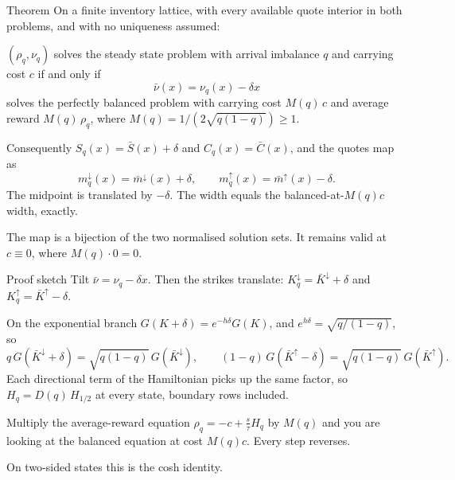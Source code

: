 \documentclass[10pt]{beamer}
\newcommand{\blue}[1]{\textcolor{pcblue}{#1}}
\begin{document}
\begin{frame}{Theorem}
On a finite inventory lattice, with every available quote interior in both problems, and with no uniqueness assumed:
\vspace{0.5em}

$(\rho_q, \nu_q)$ solves the steady state problem with arrival imbalance $q$ and carrying cost $c$ \blue{if and only if}
\[
\bar\nu(x) = \nu_q(x) - \delta x
\]
solves the perfectly balanced problem with carrying cost $M(q)\,c$ and average reward $M(q)\,\rho_q$, where $M(q) = 1/(2\sqrt{q(1-q)}) \ge 1$.
\vspace{0.5em}

Consequently $S_q(x) = \bar S(x) + \delta$ and $C_q(x) = \bar C(x)$, and the quotes map as
\[
m^{\downarrow}_q(x) = \bar m^{\downarrow}(x) + \delta, \qquad
m^{\uparrow}_q(x) = \bar m^{\uparrow}(x) - \delta .
\]
The midpoint is translated by $-\delta$. \blue{The width equals the balanced-at-$M(q)c$ width, exactly.}
\vspace{0.2em}

The map is a bijection of the two normalised solution sets. It remains valid at $c \equiv 0$, where $M(q)\cdot 0 = 0$.
\end{frame}

\begin{frame}{Proof sketch}
Tilt $\bar\nu = \nu_q - \delta x$. Then the strikes translate: $K^{\downarrow}_q = \bar K^{\downarrow} + \delta$ and $K^{\uparrow}_q = \bar K^{\uparrow} - \delta$.
\vspace{1em}

On the exponential branch $G(K + \delta) = e^{-h\delta}G(K)$, and $e^{h\delta} = \sqrt{q/(1-q)}$, so
{\small\[
q\,G(\bar K^{\downarrow} + \delta) = \sqrt{q(1-q)}\,G(\bar K^{\downarrow}), \qquad
(1-q)\,G(\bar K^{\uparrow} - \delta) = \sqrt{q(1-q)}\,G(\bar K^{\uparrow}).
\]}
Each directional term of the Hamiltonian picks up the same factor, so $H_q = D(q)\,H_{1/2}$ at every state, boundary rows included.
\vspace{1em}

Multiply the average-reward equation $\rho_q = -c + \frac{s}{\tau}H_q$ by $M(q)$ and you are looking at the balanced equation at cost $M(q)c$. Every step reverses.
\vspace{1em}

On two-sided states this is the cosh identity.
\end{frame}
\end{document}
